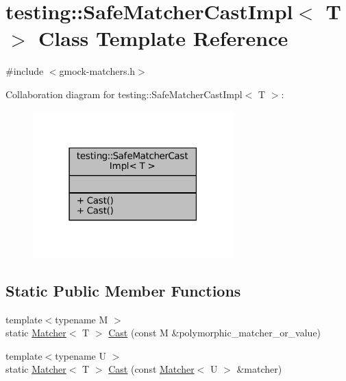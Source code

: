 \hypertarget{classtesting_1_1SafeMatcherCastImpl}{}\section{testing\+:\+:Safe\+Matcher\+Cast\+Impl$<$ T $>$ Class Template Reference}
\label{classtesting_1_1SafeMatcherCastImpl}


{\ttfamily \#include $<$gmock-\/matchers.\+h$>$}



Collaboration diagram for testing\+:\+:Safe\+Matcher\+Cast\+Impl$<$ T $>$\+:
\nopagebreak
\begin{figure}[H]
\begin{center}
\leavevmode
\includegraphics[width=219pt]{classtesting_1_1SafeMatcherCastImpl__coll__graph}
\end{center}
\end{figure}
\subsection*{Static Public Member Functions}
\begin{DoxyCompactItemize}
\item 
{\footnotesize template$<$typename M $>$ }\\static \hyperlink{classtesting_1_1Matcher}{Matcher}$<$ T $>$ \hyperlink{classtesting_1_1SafeMatcherCastImpl_a6ceab2bd71bff1677ed184eb2afa8653}{Cast} (const M \&polymorphic\+\_\+matcher\+\_\+or\+\_\+value)
\item 
{\footnotesize template$<$typename U $>$ }\\static \hyperlink{classtesting_1_1Matcher}{Matcher}$<$ T $>$ \hyperlink{classtesting_1_1SafeMatcherCastImpl_a034691f9eab929b8b25c33f13937ab95}{Cast} (const \hyperlink{classtesting_1_1Matcher}{Matcher}$<$ U $>$ \&matcher)
\end{DoxyCompactItemize}


